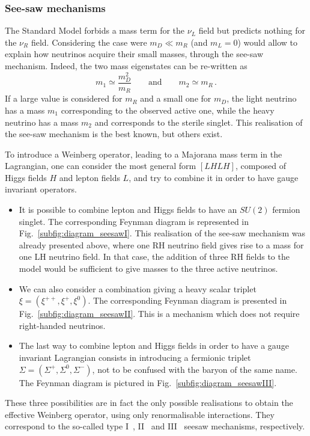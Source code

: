 \subsubsection*{See-saw mechanisms}

The Standard Model forbids a mass term for the $\nu_L$ field but predicts nothing for the $\nu_R$ field.
Considering the case were $m_D \ll m_R$ (and $m_L=0$) would allow to explain how neutrinos acquire their small masses, through the see-saw mechanism.
Indeed, the two mass eigenstates can be re-written as
\begin{equation}
  m_1\simeq \frac{m_D^2}{m_R} \qquad \text{and} \qquad m_2\simeq m_R\,.
\end{equation}
If a large value is considered for $m_R$ and a small one for $m_D$, the light neutrino has a mass $m_1$ corresponding to the observed active one, while the heavy neutrino has a mass $m_2$ and corresponds to the sterile singlet.
This realisation of the see-saw mechanism is the best known, but others exist.

To introduce a Weinberg operator, leading to a Majorana mass term in the Lagrangian, one can consider the most general form $[L H L H]$, composed of Higgs fields $H$ and lepton fields $L$, and try to combine it in order to have gauge invariant operators.
\begin{itemize}
\item It is possible to combine lepton and Higgs fields to have an $SU(2)$ fermion singlet.
  The corresponding Feynman diagram is represented in Fig.~\ref{subfig:diagram_seesawI}.
  This realisation of the see-saw mechanism was already presented above, where one RH neutrino field gives rise to a mass for one LH neutrino field.
  In that case, the addition of three RH fields to the model would be sufficient to give masses to the three active neutrinos.
\item We can also consider a combination giving a heavy scalar triplet ${\xi = (\xi^{++},\xi^{+},\xi^{0})}$.
  The corresponding Feynman diagram is presented in Fig.~\ref{subfig:diagram_seesawII}.
  This is a mechanism which does not require right-handed neutrinos.
\item The last way to combine lepton and Higgs fields in order to have a gauge invariant Lagrangian consists in introducing a fermionic triplet ${\Sigma = (\Sigma^{+},\Sigma^{0},\Sigma^{-})}$, not to be confused with the baryon of the same name.
  The Feynman diagram is pictured in Fig.~\ref{subfig:diagram_seesawIII}.
\end{itemize}
These three possibilities are in fact the only possible realisations to obtain the effective Weinberg operator, using only renormalisable interactions.
They correspond to the so-called type I~\cite{Minkowski_1977}, II~\cite{Ernest_1998} and III~\cite{Marshak_1980} seesaw mechanisms, respectively.

